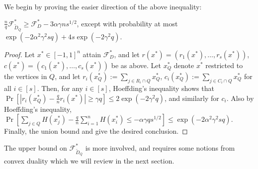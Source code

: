 \documentclass[final, 12pt]{colt2018}
\newcommand{\F}{\mathcal{F}}
\theoremstyle{definition}
\theoremstyle{plain}
\begin{document}
We begin by proving the easier direction of the above inequality:
\begin{lemma}\label{lemma:easy-direction}
$\frac{n}{q}\F^{*}_{\tilde{D}_Q} \geq \F^{*}_{D} - 3\alpha \gamma n s^{1/2}$, except with probability at most $\exp(-2\alpha^2 \gamma^2 sq) + 4s\exp(-2\gamma^2 q)$.
\end{lemma}
\begin{proof}
Let $x^*\in [-1,1]^n$ attain $\F^*_D$, and let $r(x^*)=(r_1(x^*),\dots,r_s(x^*))$, $c(x^*) = (c_1(x^*),\dots, c_s(x^*))$ be as above. Let $x^*_Q$ denote $x^*$ restricted to the vertices in $Q$, and let $r_i(x^*_Q):=\sum_{j\in R_i \cap Q}x^*_Q$, $c_i(x^*_Q):=\sum_{j \in C_i \cap Q}x^*_Q$ for all $i\in [s]$. Then, for any $i \in [s]$, Hoeffding's inequality shows that $\Pr\left[\left|r_i(x^*_Q)-\frac{q}{n}r_i(x^*)\right| \geq \gamma q\right] \leq 2\exp(-2\gamma^{2}q)$, and similarly for $c_i$. Also by Hoeffding's inequality, $\Pr\left[\sum_{j\in Q}H(x^*_j)-\frac{q}{n}\sum_{i=1}^{n}H(x^*_i) \leq -\alpha\gamma qs^{1/2}\right] \leq \exp(-2\alpha^{2}\gamma^{2}sq)$. Finally, the union bound and  give the desired conclusion.  
\end{proof}

The upper bound on $\F^{*}_{\tilde{D}_{Q}}$ is more involved, and requires some notions from convex duality which we will review in the next section.
\end{document}
